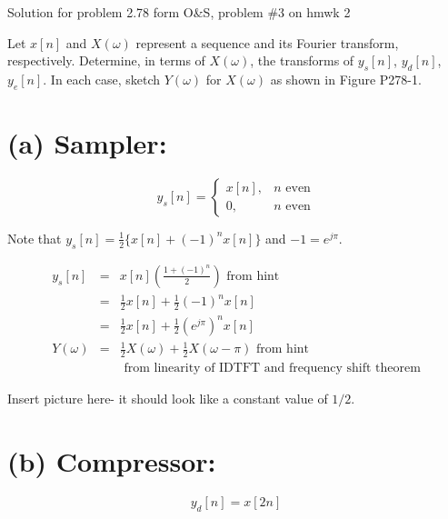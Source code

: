 \documentclass[11pt]{article}
\begin{document}
Solution for problem 2.78 form O\&S, problem \#3 on hmwk 2

Let $x[n]$ and $X(\omega)$ represent a sequence and its Fourier transform, respectively. Determine, in terms of $X(\omega)$, the transforms of $y_s[n]$, $y_d[n]$, $y_e[n]$. In each case, sketch $Y(\omega)$ for $X(\omega)$ as shown in Figure P278-1.
\section*{(a) Sampler: }
\begin{equation*}
y_s[n] = \begin{cases} x[n], & n \text{ even} \\ 
0, & n \text{ even}
\end{cases}
\end{equation*}

Note that $y_s[n]=\frac{1}{2}\{x[n]+(-1)^nx[n]\}$ and $-1=e^{j \pi}$.

\begin{eqnarray*}
y_s[n] &=& x[n]\left(\frac{1+(-1)^n}{2} \right) \text{ from hint}\\
&=& \frac{1}{2}x[n]+\frac{1}{2}(-1)^n x[n]\\
&=& \frac{1}{2}x[n]+\frac{1}{2}(e^{j\pi})^n x[n]\\
Y(\omega) &=& \frac{1}{2}X(\omega) +\frac{1}{2}X(\omega-\pi) \text{ from hint}\\
&&  \text{ from linearity of IDTFT and frequency shift theorem}
\end{eqnarray*}

Insert picture here- it should look like a constant value of $1/2$.

\section*{(b) Compressor: }
\begin{equation*}
y_d[n] = x[2n]
\end{equation*}
\end{document}
